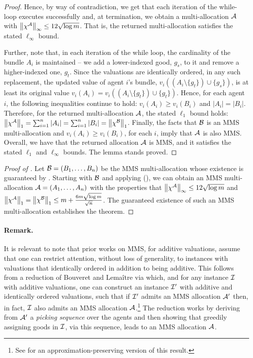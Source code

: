 \begin{proof}
Hence, by way of contradiction, we get that each iteration of the while-loop executes successfully and, at termination, we obtain a multi-allocation $\mathcal{A}$ with $\left\|\chi^{\mathcal{A}}\right\|_\infty \leq 12 \sqrt{\log m}$. That is, the returned multi-allocation satisfies the stated $\ell_\infty$ bound. 

Further, note that, in each iteration of the while loop, the cardinality of the bundle $A_i$ is maintained -- we add a lower-indexed good, $g_s$, to it and remove a higher-indexed one, $g_t$. Since the valuations are identically ordered, in any such replacement, the updated value of agent $i$'s bundle, $v_i((A_i \setminus \{g_t \}) \cup \{g_s\})$, is at least its original value $v_i(A_i) = v_i((A_i \setminus \{g_t\}) \cup \{g_t\})$. Hence, for each agent $i$, the following inequalities continue to hold: $v_i(A_i) \geq v_i(B_i)$ and $|A_i| = |B_i|$. Therefore, for the returned multi-allocation $\mathcal{A}$, the stated $\ell_1$ bound holds: $\left\|\chi^{\mathcal{A}}\right\|_1 = \sum_{i=1}^n |A_i| = \sum_{i=1}^n |B_i| = \left\|\chi^{\mathcal{B}}\right\|_1$. Finally, the facts that $\mathcal{B}$ is an MMS multi-allocation and $v_i(A_i) \geq v_i(B_i)$, for each $i$, imply that $\mathcal{A}$ is also MMS. 
Overall, we have that the returned allocation $\mathcal{A}$ is MMS, and it satisfies the stated $\ell_1$ and $\ell_\infty$ bounds. The lemma stands proved.     
\end{proof}


\begin{proof}[Proof of ]
    Let $\mathcal{B}=(B_1,\dots, B_n)$ be the MMS multi-allocation whose existence is guaranteed by . Starting with $\mathcal{B}$ and applying  (), we can obtain an MMS multi-allocation $\mathcal{A}=(A_1,\dots,A_n)$ with the properties that $\left\|\chi^{\mathcal{A}}\right\|_\infty \leq 12 \sqrt{\log m}$ and $\left\|\chi^{\mathcal{A}}\right\|_1=\left\|\chi^{\mathcal{B}}\right\|_1 \leq m+\frac{6m\sqrt{\log m}}{\sqrt{n}}$. The guaranteed existence of such an MMS multi-allocation establishes the theorem. 
\end{proof}



\paragraph{Remark.} It is relevant to note that prior works on MMS, for additive valuations, assume that one can restrict attention, without loss of generality, to instances with valuations that identically ordered in addition to being additive. This follows from a reduction of Bouveret and Lema\^{i}tre \cite{10.5555/2615731.2617458} via which, and for any instance $\mathcal{I}$ with additive valuations, one can construct an instance $\mathcal{I}'$ with additive and identically ordered valuations, such that if $\mathcal{I}'$ admits an MMS allocation $\mathcal{A}'$ then, in fact, $\mathcal{I}$ also admits an MMS allocation $\mathcal{A}$.\footnote{See \cite{barman2020approximation} for an approximation-preserving version of this result.} The reduction works by deriving from $\mathcal{A}'$ a {\it picking sequence} over the agents and then showing that greedily assigning goods in $\mathcal{I}$, via this sequence, leads to an MMS allocation $\mathcal{A}$.  

